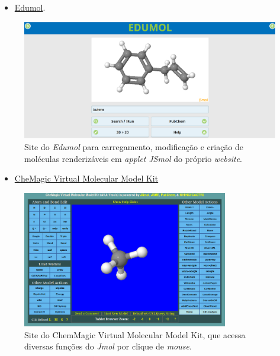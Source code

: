 \documentclass[
  letterpaper,
  DIV=11,
  numbers=noendperiod]{scrreprt}
\providecommand{\tightlist}{%
  \setlength{\itemsep}{0pt}\setlength{\parskip}{0pt}}\usepackage{longtable,booktabs,array}
\begin{document}
\begin{itemize}
\tightlist
\item
  \href{https://edumol.fi/}{Edumol}.
\end{itemize}

\begin{figure}[H]

{\centering \includegraphics{edumol.png}

}

\caption{Site do \emph{Edumol} para carregamento, modificação e criação
de moléculas renderizáveis em \emph{applet} \emph{JSmol} do próprio
\emph{website}.}

\end{figure}%

\begin{itemize}
\tightlist
\item
  \href{https://chemagic.org/molecules/amini.html}{CheMagic Virtual
  Molecular Model Kit}
\end{itemize}

\begin{figure}[H]

{\centering \includegraphics[width=0.8\textwidth,height=\textheight]{chemagic.png}

}

\caption{Site do ChemMagic Virtual Molecular Model Kit, que acessa
diversas funções do \emph{Jmol} por clique de \emph{mouse}.}

\end{figure}%
\end{document}
